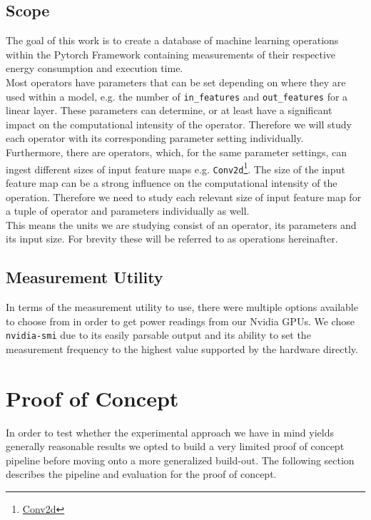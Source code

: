 \documentclass[conference]{IEEEtran}
\begin{document}
\subsection{Scope}
The goal of this work is to create a database of machine learning operations within the Pytorch Framework containing measurements of their respective energy consumption and execution time. \\
Most operators have parameters that can be set depending on where they are used within a model, e.g. the number of \texttt{in\_features} and \texttt{out\_features} for a linear layer.
These parameters can determine, or at least have a significant impact on the computational intensity of the operator. Therefore we will study each operator with its corresponding parameter setting individually. \\
Furthermore, there are operators, which, for the same parameter settings, can ingest different sizes of input feature maps e.g. \texttt{Conv2d}\footnote{\href{https://pytorch.org/docs/stable/generated/torch.nn.Conv2d.html}{Conv2d}}. The size of the input feature map can be a strong influence on the computational intensity of the operation. Therefore we need to study each relevant size of input feature map for a tuple of operator and parameters individually as well. \\
This means the units we are studying consist of an operator, its parameters and its input size. For brevity these will be referred to as operations hereinafter.




\subsection{Measurement Utility}
In terms of the measurement utility to use, there were multiple options available to choose from in order to get power readings from our Nvidia GPUs. We chose \texttt{nvidia-smi} due to its easily parsable output and its ability to set the measurement frequency to the highest value supported by the hardware directly.


\section{Proof of Concept}

In order to test whether the experimental approach we have in mind yields generally reasonable results we opted to build a very limited proof of concept pipeline before moving onto a more generalized build-out. The following section describes the pipeline and evaluation for the proof of concept.
\end{document}

